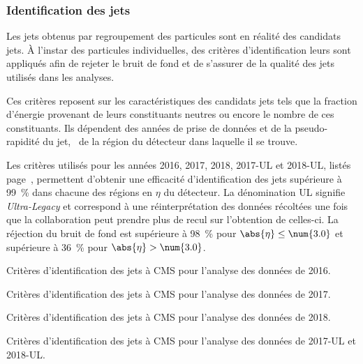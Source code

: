 \subsubsection{Identification des jets}\label{chapter-CMS-section-jets_reco-subsec-jetID}
Les jets obtenus par regroupement des particules sont en réalité des \og candidats \fg{} jets.
À l'instar des particules individuelles, des critères d'identification leurs sont appliqués afin de rejeter le bruit de fond et de s'assurer de la qualité des jets utilisés dans les analyses.
\par
Ces critères reposent sur les caractéristiques des candidats jets tels que la fraction d'énergie provenant de leurs constituants neutres ou encore le nombre de ces constituants.
Ils dépendent des années de prise de données et de la pseudo-rapidité du jet, \ie\ de la région du détecteur dans laquelle il se trouve.
\par Les critères utilisés pour les années 2016, 2017, 2018, 2017-UL et 2018-UL, listés page~\pageref{tab-chapter-CMS-section-jets_reco-subsec-jetID-2017UL}, permettent d'obtenir une efficacité d'identification des jets supérieure à \SI{99}{\%} dans chacune des régions en $\eta$ du détecteur.
La dénomination \og UL \fg{} signifie \emph{Ultra-Legacy} et correspond à une réinterprétation des données récoltées une fois que la collaboration peut prendre plus de recul sur l'obtention de celles-ci.
La réjection du bruit de fond est supérieure à \SI{98}{\%} pour $\abs{\eta}\leq\num{3.0}$ et supérieure à \SI{36}{\%} pour $\abs{\eta}>\num{3.0}$.
\begin{table}[p]
\centering

\caption[Critères d'identification des jets pour l'année 2016.]{Critères d'identification des jets à CMS pour l'analyse des données de 2016.}
\label{tab-chapter-CMS-section-jets_reco-subsec-jetID-2016}
\end{table}
\begin{table}[p]
\centering

\caption[Critères d'identification des jets pour l'année 2017.]{Critères d'identification des jets à CMS pour l'analyse des données de 2017.}
\label{tab-chapter-CMS-section-jets_reco-subsec-jetID-2017}
\end{table}
\begin{table}[p]
\centering

\caption[Critères d'identification des jets pour l'année 2018.]{Critères d'identification des jets à CMS pour l'analyse des données de 2018.}
\label{tab-chapter-CMS-section-jets_reco-subsec-jetID-2018}
\end{table}
\begin{table}[p]
\centering

\caption[Critères d'identification des jets pour les années 2017-UL et 2018-UL.]{Critères d'identification des jets à CMS pour l'analyse des données de 2017-UL et 2018-UL.}
\label{tab-chapter-CMS-section-jets_reco-subsec-jetID-2017UL}
\end{table}

